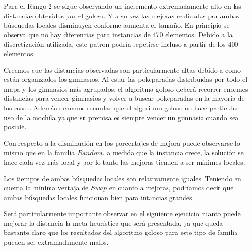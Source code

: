 Para el Rango 2 se sigue observando un incremento extremadamente alto en las distancias obtenidas por el goloso. Y a su vez las mejoras realizadas por ambas búsquedas locales disminuyen conforme aumenta el tamaño. En principio se observa que no hay diferencias para instancias de 470 elementos. Debido a la discretización utilizada, este patron podría repetirse incluso a partir de los 400 elementos.

Creemos que las distancias observadas son particularmente altas debido a como están organizados los gimnasios. Al estar las pokeparadas distribuidas por todo el mapa y los gimnasios más agrupados, el algoritmo goloso deberá recorrer enormes distancias para vencer gimnasios y volver a buscar pokeparadas en la mayoria de los casos. Además debemos recordar que el algoritmo goloso no hace particular uso de la mochila ya que su premisa es siempre vencer un gimnasio cuando sea posible.

Con respecto a la disminución en los porcentajes de mejora puede observarse lo mismo que en la familia $Random$, a medida que la instancia crece, la solución se hace cada vez más local y por lo tanto las mejoras tienden a ser mínimos locales. 

Los tiempos de ambas búsquedas locales son relativamente iguales. Teniendo en cuenta la mínima ventaja de $Swap$ en cuanto a mejoras, podríamos decir que ambas búsquedas locales funcionan bien para intancias grandes.

Será particularmente importante observar en el siguiente ejercicio cuanto puede mejorar la distancia la meta heurística que será presentada, ya que queda bastante claro que los resultados del algoritmo goloso para este tipo de familia pueden ser extramadamente malos. 
\\\\